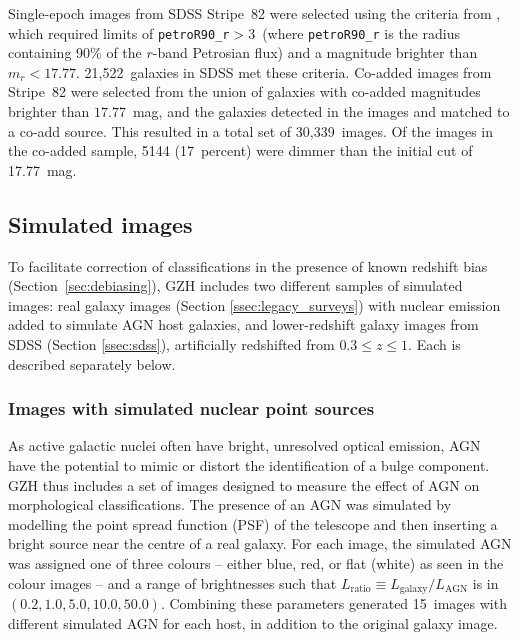 \documentclass[a4paper,fleqn,usenatbib]{mnras}
\begin{document}
Single-epoch images from SDSS Stripe~82 were selected using the criteria
from \citet{wil13}, which required limits of \texttt{petroR90\_r}$ >
3$\arcsec~(where \texttt{petroR90\_r} is the radius containing 90\% of the
$r$-band Petrosian flux) and a magnitude brighter than $m_r < 17.77$.
21,522~galaxies in SDSS met these criteria.
Co-added images from Stripe~82 were selected from the union of galaxies with
co-added magnitudes brighter than $17.77$~mag, and the galaxies detected in the
\stripe{} images and matched to a co-add source. This resulted in a total
set of 30,339~images. Of the images in the co-added sample, 5144 (17~percent)
were dimmer than the initial cut of 17.77~mag. 


\subsection{Simulated \hst{} images}\label{ssec:simulatedimages}

To facilitate correction of classifications in the presence of known redshift
bias (Section~\ref{sec:debiasing}), GZH includes two different samples of
simulated \hst{} images: real \hst{} galaxy images (Section
\ref{ssec:legacy_surveys}) with nuclear emission added to simulate AGN host
galaxies, and lower-redshift galaxy images from SDSS (Section \ref{ssec:sdss}),
artificially redshifted from $0.3 \leq z \leq 1$.  Each is described separately
below. 

\subsubsection{Images with simulated nuclear point sources}\label{ssec:sim_agn}

As active galactic nuclei often have bright, unresolved optical emission, AGN
have the potential to mimic or distort the identification of a bulge component.
GZH thus includes a set of images designed to measure the effect of AGN on
morphological classifications.  The presence of an AGN was simulated by
modelling the point spread function (PSF) of the telescope and then inserting a
bright source near the centre of a real galaxy. For each image, the simulated
AGN was assigned one of three colours -- either blue, red, or flat (white) as
seen in the colour images -- and a range of brightnesses such that
$L_\mathrm{ratio} \equiv L_\mathrm{galaxy}/L_\mathrm{AGN}$ is in
$(0.2,1.0,5.0,10.0,50.0)$. Combining these parameters generated 15~images
with different simulated AGN for each host, in addition to the original galaxy
image. 
\end{document}
